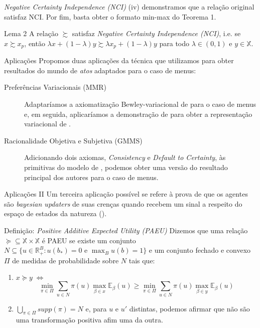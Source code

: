 \documentclass[11pt]{beamer}
\theoremstyle{nonumberplain}
\theoremstyle{plain}
\begin{document}
\begin{frame}{\emph{Negative Certainty Independence (NCI)}}
(iv) demonstramos que a relação original satisfaz NCI. Por fim, basta obter o formato min-max do Teorema 1.
\begin{block}{Lema 2}
A relação $\succsim$ satisfaz \emph{Negative Certainty Independence (NCI)}, i.e. se $x\succsim x_p$, então $\lambda x +(1-\lambda)y\succsim \lambda x_p +(1-\lambda)y$ para todo $\lambda\in(0,1)$ e $y\in \mathbb{X}$.
\end{block}

\end{frame}

\begin{frame}{Aplicações}
Propomos duas aplicações da técnica que utilizamos para obter resultados do mundo de \emph{atos} adaptados para o caso de menus:
\begin{description}
\item[Preferências Variacionais (MMR)]
Adaptaríamos a axiomatização Bewley-variacional de \cite{Faro2015} para o caso de menus e, em seguida, aplicaríamos a demonstração de \cite{Brotherhood2014} para obter a representação variacional de \cite{Maccheroni2006}.

\item[Racionalidade Objetiva e Subjetiva (GMMS)]
Adicionando dois axiomas, \emph{Consistency} e \emph{Default to Certainty}, às primitivas do modelo de \cite{Gilboa2010}, podemos obter uma versão do resultado principal dos autores para o caso de menus.
\end{description}

\end{frame}

\begin{frame}{Aplicações II}
Um terceira aplicação possível se refere à prova de que os agentes são \emph{bayesian updaters} de suas crenças quando recebem um sinal a respeito do espaço de estados da natureza (\cite{Riella2013a}).\pause
\begin{block}{Definição: \emph{Positive Additive Expected Utility (PAEU)}}
Dizemos que uma relação $\succcurlyeq\subseteq\mathbb{X}\times\mathbb{X}$ é PAEU se existe um conjunto $N\subseteq \{u \in \mathbb{R}^B_+:u(b_*)=0\text { e }\max_{B}u(b)=1\}$ e um conjunto fechado e convexo $\Pi$ de medidas de probabilidade sobre $N$ tais que:
\begin{enumerate}[1.]
\item $x \succcurlyeq y \;\Leftrightarrow\;$ $$\min_{\pi\in\Pi}\sum_{u\in N} \pi(u)\max_{\beta\in x}\mathbb{E}_\beta(u)\geq \min_{\pi\in\Pi}\sum_{u\in N} \pi(u)\max_{\beta\in y}\mathbb{E}_\beta(u)$$
\item $\bigcup_{\pi\in\Pi}supp(\pi)=N$ e, para $u$ e $u'$ distintas, podemos afirmar que não são uma transformação positiva afim uma da outra.
\end{enumerate}
\end{block} 
\end{frame}
\end{document}
